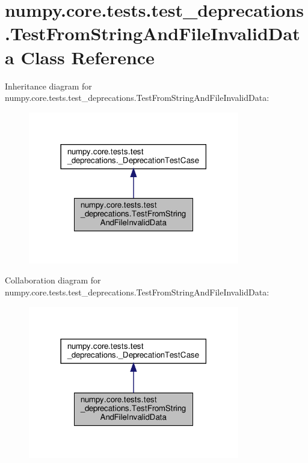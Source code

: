 \hypertarget{classnumpy_1_1core_1_1tests_1_1test__deprecations_1_1TestFromStringAndFileInvalidData}{}\section{numpy.\+core.\+tests.\+test\+\_\+deprecations.\+Test\+From\+String\+And\+File\+Invalid\+Data Class Reference}
\label{classnumpy_1_1core_1_1tests_1_1test__deprecations_1_1TestFromStringAndFileInvalidData}


Inheritance diagram for numpy.\+core.\+tests.\+test\+\_\+deprecations.\+Test\+From\+String\+And\+File\+Invalid\+Data\+:
\nopagebreak
\begin{figure}[H]
\begin{center}
\leavevmode
\includegraphics[width=261pt]{classnumpy_1_1core_1_1tests_1_1test__deprecations_1_1TestFromStringAndFileInvalidData__inherit__graph}
\end{center}
\end{figure}


Collaboration diagram for numpy.\+core.\+tests.\+test\+\_\+deprecations.\+Test\+From\+String\+And\+File\+Invalid\+Data\+:
\nopagebreak
\begin{figure}[H]
\begin{center}
\leavevmode
\includegraphics[width=261pt]{classnumpy_1_1core_1_1tests_1_1test__deprecations_1_1TestFromStringAndFileInvalidData__coll__graph}
\end{center}
\end{figure}
